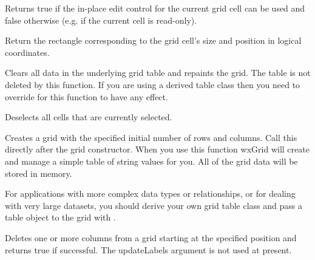 
Returns true if the in-place edit control for the current grid cell can be used and
false otherwise (e.g. if the current cell is read-only).

\label{wxgridcelltorect}



Return the rectangle corresponding to the grid cell's size and position in logical
coordinates.

\label{wxgridcleargrid}


Clears all data in the underlying grid table and repaints the grid. The table is not deleted by
this function. If you are using a derived table class then you need to override 
 for this function to have any effect.

\label{wxgridclearselection}


Deselects all cells that are currently selected.

\label{wxgridcreategrid}


Creates a grid with the specified initial number of rows and columns.
Call this directly after the grid constructor. When you use this
function wxGrid will create and manage a simple table of string values
for you. All of the grid data will be stored in memory.

For applications with more complex data types or relationships, or for
dealing with very large datasets, you should derive your own grid table
class and pass a table object to the grid with . 

\label{wxgriddeletecols}


Deletes one or more columns from a grid starting at the specified position and returns
true if successful. The updateLabels argument is not used at present.

